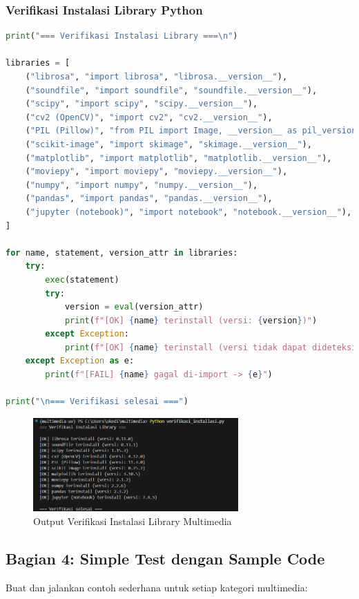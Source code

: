 \documentclass[11pt,a4paper]{article}
\begin{document}
\subsubsection{Verifikasi Instalasi Library Python}
\begin{lstlisting}[language=Python, caption=Verifikasi instalasi library multimedia Python]
print("=== Verifikasi Instalasi Library ===\n")

libraries = [
    ("librosa", "import librosa", "librosa.__version__"),
    ("soundfile", "import soundfile", "soundfile.__version__"),
    ("scipy", "import scipy", "scipy.__version__"),
    ("cv2 (OpenCV)", "import cv2", "cv2.__version__"),
    ("PIL (Pillow)", "from PIL import Image, __version__ as pil_version", "pil_version"),
    ("scikit-image", "import skimage", "skimage.__version__"),
    ("matplotlib", "import matplotlib", "matplotlib.__version__"),
    ("moviepy", "import moviepy", "moviepy.__version__"),
    ("numpy", "import numpy", "numpy.__version__"),
    ("pandas", "import pandas", "pandas.__version__"),
    ("jupyter (notebook)", "import notebook", "notebook.__version__"),
]

for name, statement, version_attr in libraries:
    try:
        exec(statement)
        try:
            version = eval(version_attr)
            print(f"[OK] {name} terinstall (versi: {version})")
        except Exception:
            print(f"[OK] {name} terinstall (versi tidak dapat dideteksi)")
    except Exception as e:
        print(f"[FAIL] {name} gagal di-import -> {e}")

print("\n=== Verifikasi selesai ===")
\end{lstlisting}

\begin{figure}[H] 
    \centering
    \includegraphics[width=0.7\textwidth]{Figure/verifikasi.png}
    \caption{Output Verifikasi Instalasi Library Multimedia}
    \label{fig:contoh-gambar}
\end{figure}

\subsection{Bagian 4: Simple Test dengan Sample Code}
Buat dan jalankan contoh sederhana untuk setiap kategori multimedia:
\end{document}
